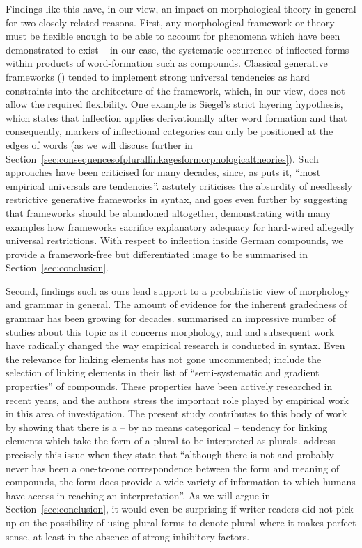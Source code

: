 Findings like this have, in our view, an impact on morphological theory in general for two closely related reasons.
First, any morphological framework or theory must be flexible enough to be able to account for phenomena which have been demonstrated to exist -- in our case, the systematic occurrence of inflected forms within products of word-formation such as compounds.
Classical generative frameworks (\egg \citealt{Siegel1979,Mohanan1986,Anderson1992,Pinker1999}) tended to implement strong universal tendencies as hard constraints into the architecture of the framework, which, in our view, does not allow the required flexibility.
One example is Siegel's strict layering hypothesis, which states that inflection applies derivationally after word formation and that consequently, markers of inflectional categories can only be positioned at the edges of words (as we will discuss further in Section~\ref{sec:consequencesofplurallinkagesformorphologicaltheories}).
Such approaches have been criticised for many decades, since, as \textcite[391]{Haspelmath2010} puts it, ``most empirical universals are tendencies''.
\textcite{Pollard1996} astutely criticises the absurdity of needlessly restrictive generative frameworks in syntax, and \textcite{Haspelmath2010} goes even further by suggesting that frameworks should be abandoned altogether, demonstrating with many examples how frameworks sacrifice explanatory adequacy for hard-wired allegedly universal restrictions.
With respect to inflection inside German compounds, we provide a framework-free but differentiated image to be summarised in Section~\ref{sec:conclusion}.

Second, findings such as ours lend support to a probabilistic view of morphology and grammar in general.
The amount of evidence for the inherent gradedness of grammar has been growing for decades.
\textcite{HayBaayen2005} summarised an impressive number of studies about this topic as it concerns morphology, and \textcite{Bresnan2007} and subsequent work have radically changed the way empirical research is conducted in syntax.
Even the relevance for linking elements has not gone uncommented; \textcite[105]{ArndtlappeEa2016} include the selection of linking elements in their list of ``semi-systematic and gradient properties'' of compounds.
These properties have been actively researched in recent years, and the authors stress the important role played by empirical work in this area of investigation.
The present study contributes to this body of work by showing that there is a -- by no means categorical -- tendency for linking elements which take the form of a plural to be interpreted as plurals.
\textcite[107]{ArndtlappeEa2016} address precisely this issue when they state that ``although there is not and probably never has been a one-to-one correspondence between the form and meaning of compounds, the form does provide a wide variety of information to which humans have access in reaching an interpretation''.
As we will argue in Section~\ref{sec:conclusion}, it would even be surprising if writer-readers did not pick up on the possibility of using plural forms to denote plural where it makes perfect sense, at least in the absence of strong inhibitory factors.

